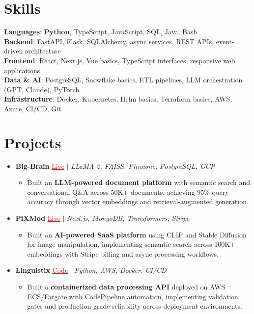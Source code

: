 \documentclass[letterpaper,10pt]{article}
\newcommand{\resumeItem}[1]{\item\small{{#1 \vspace{-2pt}}}}
\newcommand{\resumeProjectHeading}[1]{\item \small #1 \vspace{-2pt}}
\newcommand{\resumeSubHeadingListStart}{\begin{itemize}[leftmargin=0.0in, label={}]}
\newcommand{\resumeSubHeadingListEnd}{\end{itemize}}
\newcommand{\resumeProjItemListStart}{\begin{itemize}[leftmargin=0.15in,label=\textbullet,itemsep=0pt,topsep=0pt,parsep=0pt,partopsep=0pt]}
\newcommand{\resumeProjItemListEnd}{\end{itemize}\vspace{-4pt}}
\begin{document}
\section{Skills}
\begin{itemize}[leftmargin=0.15in, label={}]
\small{\item{
\textbf{Languages}: \textbf{Python}, TypeScript, JavaScript, SQL, Java, Bash \\
\textbf{Backend}: FastAPI, Flask, SQLAlchemy, async services, REST APIs, event-driven architecture \\
\textbf{Frontend}: React, Next.js, Vue basics, TypeScript interfaces, responsive web applications \\
\textbf{Data \& AI}: PostgreSQL, Snowflake basics, ETL pipelines, LLM orchestration (GPT, Claude), PyTorch \\
\textbf{Infrastructure}: Docker, Kubernetes, Helm basics, Terraform basics, AWS, Azure, CI/CD, Git
}}
\end{itemize}
\vspace{-16pt}
\section{Projects}
\resumeSubHeadingListStart
\vspace{-2pt}
\resumeProjectHeading{\textbf{Big-Brain} {\href{https://big-brain-pied.vercel.app/}{\textcolor{red}{\underline{Live}}}} $|$ \emph{LLaMA-2, FAISS, Pinecone, PostgreSQL, GCP}}
\resumeProjItemListStart
\resumeItem{Built an \textbf{LLM-powered document platform} with semantic search and conversational Q\&A across 50K+ documents, achieving 95\% query accuracy through vector embeddings and retrieval-augmented generation.}
\resumeProjItemListEnd
\vspace{3pt}
\resumeProjectHeading{\textbf{PiXMod} {\href{https://pixmod.vercel.app/}{\textcolor{red}{\underline{Live}}}} $|$ \emph{Next.js, MongoDB, Transformers, Stripe}}
\resumeProjItemListStart
\resumeItem{Built an \textbf{AI-powered SaaS platform} using CLIP and Stable Diffusion for image manipulation, implementing semantic search across 100K+ embeddings with Stripe billing and async processing workflows.}
\resumeProjItemListEnd
\vspace{3pt}
\resumeProjectHeading{\textbf{Linguistix} {\href{https://github.com/SAHAJ-BHADJA/Linguistix}{\textcolor{red}{\underline{Code}}}} $|$ \emph{Python, AWS, Docker, CI/CD}}
\resumeProjItemListStart
\resumeItem{Built a \textbf{containerized data processing API} deployed on AWS ECS/Fargate with CodePipeline automation, implementing validation gates and production-grade reliability across deployment environments.}
\resumeProjItemListEnd
\resumeSubHeadingListEnd
\end{document}
